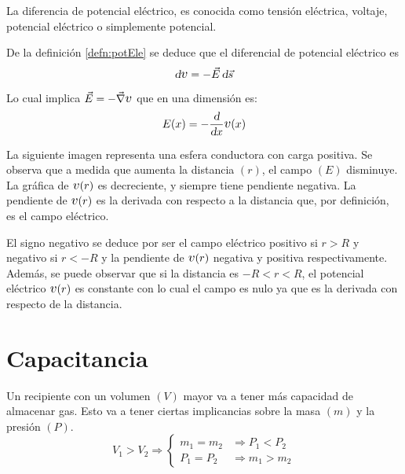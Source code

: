 La diferencia de potencial eléctrico, es conocida como tensión eléctrica, voltaje, potencial eléctrico o simplemente potencial.

De la definición \ref{defn:potEle} se deduce que el diferencial de potencial eléctrico es
\begin{equation*}
    \dif \voltage = - \Vec{E} \, \dif \Vec{s}
\end{equation*}

Lo cual implica $\Vec{E} = - \grad \voltage$ que en una dimensión es:
\begin{equation*}
    E(x) = - \frac{\dif}{\dif x} \voltage(x)
\end{equation*}

La siguiente imagen representa una esfera conductora con carga positiva.
Se observa que a medida que aumenta la distancia $(r)$, el campo $(E)$ disminuye.
La gráfica de $\voltage(r)$ es decreciente, y siempre tiene pendiente negativa.
La pendiente de $\voltage(r)$ es la derivada con respecto a la distancia que, por definición, es el campo eléctrico.

\begin{center}
    \def\svgwidth{0.8\linewidth}
    
\end{center}

El signo negativo se deduce por ser el campo eléctrico positivo si $r > R$ y negativo si $r < -R$ y la pendiente de $\voltage(r)$ negativa y positiva respectivamente.
Además, se puede observar que si la distancia es $-R < r < R$, el potencial eléctrico $\voltage(r)$ es constante con lo cual el campo es nulo ya que es la derivada con respecto de la distancia.


\section{Capacitancia}

Un recipiente con un volumen $(V)$ mayor va a tener más capacidad de almacenar gas.
Esto va a tener ciertas implicancias sobre la masa $(m)$ y la presión $(P)$.
\begin{equation*}
    V_1 > V_2 \Rightarrow
    \left\{
    \begin{aligned}
        m_1 = m_2 & \Rightarrow P_1 < P_2
        \\
        P_1 = P_2 & \Rightarrow m_1 > m_2
    \end{aligned}
    \right.
\end{equation*}

